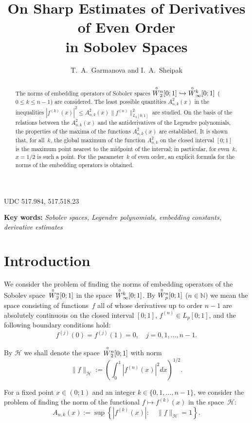 \documentclass[12pt,oneside]{amsproc}
\title[]{On Sharp Estimates of Derivatives of Even Order\\
in Sobolev Spaces}
\author{T.~A.~Garmanova and I.~A.~Sheipak}
\numberwithin{equation}{section}
\newcommand{\Wo}{{\raisebox{0.2ex}{$\stackrel{\circ}{W}$}}{}}
\begin{document}
\noindent UDC 517.984, 517.518.23

\begin{abstract}
 The norms of embedding operators of Sobolev spaces
$\Wo^n_2[0;1]\hookrightarrow\Wo^k_\infty[0;1]$
($0\leqslant k\leqslant n-1$)
are considered.
 The least possible quantities
$A^2_{n,k}(x)$
in the inequalities
$|f^{(k)}(x)|^2\leqslant
A^2_{n,k}(x)\|f^{(n)}\|^2_{L_2[0;1]}$
are studied.
 On the basis of the relations
between the
$A^2_{n,k}(x)$
and the antiderivatives of the Legendre polynomials,
the properties of the maxima of the functions
$A^2_{n,k}(x)$
are established.
 It is shown
that, for all~$k$,
the global maximum of the function
$A^2_{n,k}$
on the closed interval
$[0;1]$
is the maximum point nearest to the midpoint of the interval;
in particular,
for even~$k$,
$x=1/2$ is such a point.
 For the parameter~$k$ of even order,
an explicit formula for the norms of the embedding operators
is obtained.
\end{abstract}

\maketitle

{\small\textbf{Key words: }\textit{Sobolev spaces, Legendre polynomials,
embedding constants, derivative estimates}}

\section{Introduction}
 We consider the problem of finding the norms of embedding operators of the Sobolev space~$\Wo_2^n[0;1]$
in the space~$\Wo_\infty^k[0;1]$.
 By
$\Wo_p^n[0;1]$
($n\in\mathbb{N}$)
we mean the space consisting of functions~$f$
all of whose derivatives up to order $n-1$
are absolutely continuous
on the closed interval
$[0;1]$, $f^{(n)}\in L_p[0;1]$,
and the following boundary conditions hold:
$$
f^{(j)}(0)=f^{(j)}(1)=0,\quad j=0,1,\ldots, n-1.
$$

 By
$\mathcal H$
we shall denote the space~$\Wo_2^n[0;1]$
with norm
$$
\|f\|_{\mathcal H}:=\left(\int_0^1\left|f^{(n)}(x)\right|^2dx\right)^{1/2}.
$$

 For a fixed point
$x\in(0;1)$
and an integer
$k\in\{0,1,\ldots, n-1\}$,
we consider the problem of finding the norm of the functional
$f\mapsto f^{(k)}(x)$
in the space~$\mathcal H$:
\begin{equation}
\label{eq:ekstr}
A_{n,k}(x):=\sup\left\{|f^{(k)}(x)|:\quad \|f\|_{\mathcal H}=1\right\}.
\end{equation}
\end{document}
